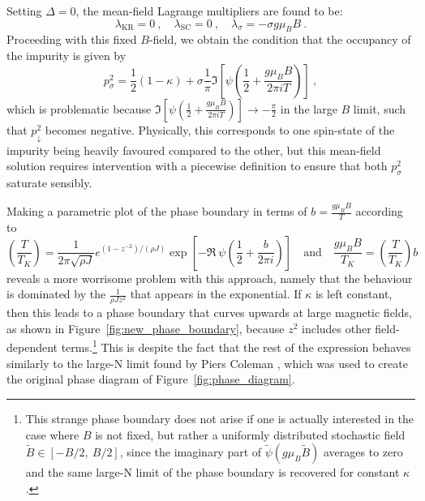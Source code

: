 Setting $ \Delta = 0 $, the mean-field Lagrange multipliers are found to be:
\begin{equation}
\lambda_{\text{KR}} = 0 ~, \quad \lambda_{\text{SC}} = 0 ~,
\quad \lambda_{\sigma} = - \sigma g \mu_{B} B ~.
\end{equation}
Proceeding with this fixed $ B $-field, we obtain the condition that the occupancy of the impurity is given by
\begin{equation}
p^2_{\sigma} = \frac{1}{2} ( 1 - \kappa ) + \sigma \frac{1}{\pi} \Im{\left[ \psi\left( \frac{1}{2} + \frac{g \mu_B B}{2 \pi i T} \right) \right]} ~,
\end{equation}
which is problematic because $ \Im{\left[ \psi\left( \frac{1}{2} + \frac{g \mu_B B}{2 \pi i T} \right) \right]} \rightarrow - \frac{\pi}{2} $ in the large $ B $ limit, such that $ p^2_{\downarrow} $ becomes negative. Physically, this corresponds to one spin-state of the impurity being heavily favoured compared to the other, but this mean-field solution requires intervention with a piecewise definition to ensure that both $ p^2_{\sigma} $ saturate sensibly.

Making a parametric plot of the phase boundary in terms of $ b = \frac{g \mu_B B}{T} $ according to
\begin{equation}
\left( \frac{T}{T_K} \right) = \frac{1}{2 \pi \sqrt{\rho J}} e^{\left( 1 - z^{-2} \right) / (\rho J)} \exp{\left[ - \Re ~ \psi \left( \frac{1}{2} + \frac{b}{2 \pi i} \right) \right]} \quad \text{and} \quad \frac{g \mu_B B}{T_K} = \left( \frac{T}{T_K} \right) b
\label{eq:phase_parametric}
\end{equation}
reveals a more worrisome problem with this approach, namely that the behaviour is dominated by the $ \frac{1}{\rho J z^2} $ that appears in the exponential. If $ \kappa $ is left constant, then this leads to a phase boundary that curves upwards at large magnetic fields, as shown in Figure~\ref{fig:new_phase_boundary}, because $ z^2 $ includes other field-dependent terms.\footnote{This strange phase boundary does not arise if one is actually interested in the case where $ B $ is not fixed, but rather a uniformly distributed stochastic field $ \widetilde{B} \in [ - B / 2, ~ B / 2 ] $, since the imaginary part of $ \widetilde{\psi} (g \mu_B \widetilde{B}) $ averages to zero and the same large-N limit of the phase boundary is recovered for constant $ \kappa $.} This is despite the fact that the rest of the expression behaves similarly to the large-N limit found by Piers Coleman \cite{ManyBodyPhysics}, which was used to create the original phase diagram of Figure~\ref{fig:phase_diagram}.

